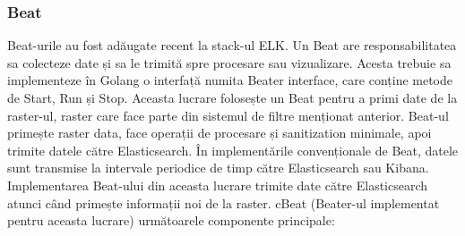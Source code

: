 \documentclass[12pt]{report}
\begin{document}
			\subsubsection{Beat}
Beat-urile au fost adăugate recent la stack-ul ELK. Un Beat are responsabilitatea sa colecteze date și sa le trimită spre procesare sau vizualizare. Acesta trebuie sa implementeze în Golang o interfață numita Beater interface, care conține metode de Start, Run și Stop. Aceasta lucrare folosește un Beat pentru a primi date de la raster-ul, raster care face parte din sistemul de filtre menționat anterior. Beat-ul primește raster data, face operații de procesare și sanitization minimale, apoi trimite datele către Elasticsearch. În  implementările convenționale de Beat, datele sunt transmise la intervale periodice de timp către Elasticsearch sau Kibana. Implementarea Beat-ului din aceasta lucrare trimite date către Elasticsearch atunci când primește informații noi de la raster. cBeat (Beater-ul implementat pentru aceasta lucrare) următoarele componente principale:
\end{document}
